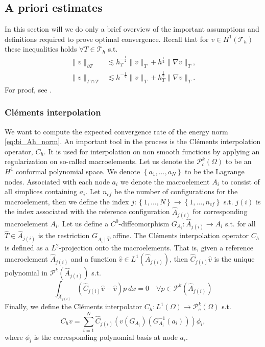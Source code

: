 
\newpage
\subsection{A priori estimates}%
\label{sec:a_priori_estimates}


In this section will we do only a brief overview of the important assumptions and definitions required to prove optimal convergence.
Recall that for $v \in H^{1}( \mathcal{T } _{h}) $ these inequalities holds $\forall T \in \mathcal{T} _{h}$ s.t. \[
\begin{split}
    \| v \|_{ \partial T }^{  } &\lesssim h^{-\frac{1}{2}}_{T}\|  v \|_{ T }^{  }+ h^{\frac{1}{2}} \| \nabla v \|_{T  }^{   }  , \\
    \| v \|_{ \Gamma \cap T }^{  } &\lesssim  h^{-\frac{1}{2}} \| v \|_{T  }^{  }   + h^{\frac{1}{2}}_{T} \| \nabla v \|_{ T }^{  }.
\end{split}
\]
For proof, see \cite[Lemma 4.2]{hansbo2003finite}.

\subsubsection{Cléments interpolation}%
\label{ssub:clement_operator}

We want to compute the expected convergence rate of the energy norm \eqref{eq:bi_Ah_norm}. An important tool in the process is the Cléments interpolation operator, $C_{h}$.
It is used for interpolation on non smooth functions by applying an regularization on so-called macroelements. Let us denote the $\mathcal{P}_{c}^{k}( \Omega )  $ to be an $H^{1}$ conformal polynomial space. We denote $\left\{ a_{1}, \ldots, a_{N}
\right\} $ to be the Lagrange nodes. Associated with each node $a_{i}$ we denote the macroelement $A_{i}$ to consist of all simplices containing $a_{i}$. Let $n_{cf}$ be the number of configurations for the macroelement, then we define the index $j:
\left\{ 1,\ldots,N \right\} \to \left\{ 1, \ldots, n_{cf} \right\}  $ s.t. $j( i) $ is the index associated with the reference configuration $\widehat{A}_{j(i) }$ for corresponding macroelement $A_{i}$. Let us define a $C^{0}$-diffeomorphism $G_{A_{i}}:
\widehat{A}_{j( i) } \to A_{i}$ s.t. for all $\widehat{T} \in \widehat{A}_{j( i) } $ is the restriction $G_{A_{i}  \mid \widehat{T}}$ affine. The Cléments interpolation operator $C_{h}$ is defined as a $L^2$-projection onto the macroelements. That is, given
a reference macroelement $\widehat{A}_{j( i) }$ and a function $\hat{v} \in L^{1}( \widehat{A}_{j( i) })  $, then $\widehat{C}_{j( i) } \hat{v}$  is the unique polynomial in $\mathcal{P}^{k} ( \widehat{A}_{j( i) })  $ s.t. \[
\int_{  \widehat{A}_{j( i) }}^{} ( \widehat{C}_{j( i) } \hat{v} - \hat{v}) p \ dx  = 0 \quad  \forall p \in \mathcal{P}^{k} ( \widehat{A}_{j( i) })
\]
Finally, we define the Cléments interpolator $C_{h} : L^{1}( \Omega )  \to \mathcal{P} ^{k}_{c}(\Omega  ) $ s.t.
\[
C_{h} v = \sum_{i=1}^{N} \widehat{C}_{j( i) } ( v (G_{A_{i}}) (G^{-1}_{A_{i}}(a_{i})) )\phi _{i},
\]
where $\phi _{i}$ is the corresponding polynomial basis at node $a_{i}$.

